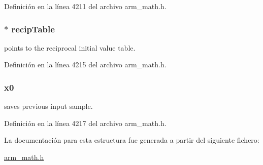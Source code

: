 Definición en la línea 4211 del archivo arm\+\_\+math.\+h.

\subsubsection[{\texorpdfstring{recip\+Table}{recipTable}}]{$\ast$ recip\+Table}\hypertarget{structarm__lms__norm__instance__q31_aec8a88dd688519b6b1e3c8d2e24bb775}{}\label{structarm__lms__norm__instance__q31_aec8a88dd688519b6b1e3c8d2e24bb775}
points to the reciprocal initial value table. 

Definición en la línea 4215 del archivo arm\+\_\+math.\+h.

\subsubsection[{\texorpdfstring{x0}{x0}}]{ x0}\hypertarget{structarm__lms__norm__instance__q31_a973b8350a0c7b113a5f002bc0b86bf76}{}\label{structarm__lms__norm__instance__q31_a973b8350a0c7b113a5f002bc0b86bf76}
saves previous input sample. 

Definición en la línea 4217 del archivo arm\+\_\+math.\+h.



La documentación para esta estructura fue generada a partir del siguiente fichero\+:\begin{DoxyCompactItemize}
\item 
\hyperlink{arm__math_8h}{arm\+\_\+math.\+h}\end{DoxyCompactItemize}
